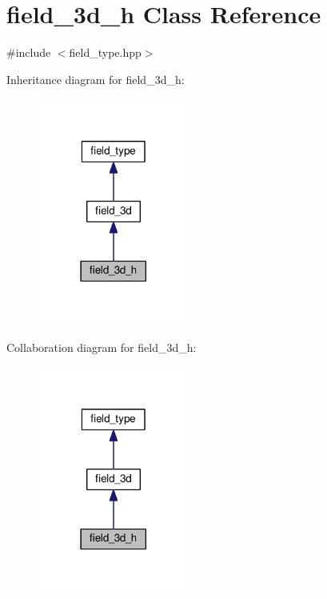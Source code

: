 \hypertarget{classfield__3d__h}{}\section{field\+\_\+3d\+\_\+h Class Reference}
\label{classfield__3d__h}


{\ttfamily \#include $<$field\+\_\+type.\+hpp$>$}



Inheritance diagram for field\+\_\+3d\+\_\+h\+:
\nopagebreak
\begin{figure}[H]
\begin{center}
\leavevmode
\includegraphics[width=141pt]{d7/d5b/classfield__3d__h__inherit__graph}
\end{center}
\end{figure}


Collaboration diagram for field\+\_\+3d\+\_\+h\+:
\nopagebreak
\begin{figure}[H]
\begin{center}
\leavevmode
\includegraphics[width=141pt]{dd/d2a/classfield__3d__h__coll__graph}
\end{center}
\end{figure}
